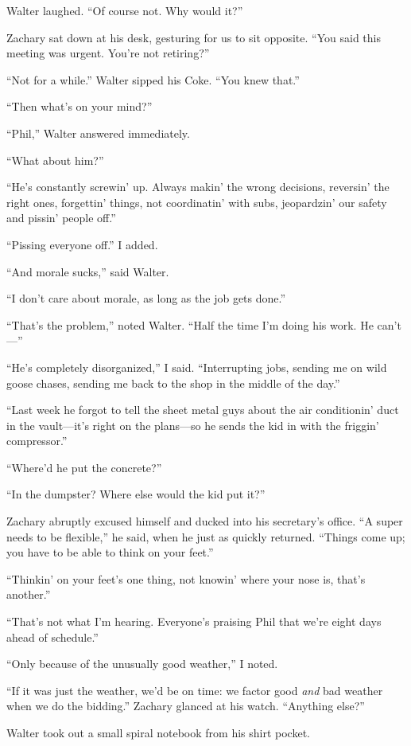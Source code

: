 Walter laughed. ``Of course not. Why would it?''

Zachary sat down at his desk, gesturing for us to sit opposite. ``You
said this meeting was urgent. You're not retiring?''

``Not for a while.'' Walter sipped his Coke. ``You knew that.''

``Then what's on your mind?''

``Phil,'' Walter answered immediately.

``What about him?''

``He's constantly screwin' up. Always makin' the wrong decisions,
reversin' the right ones, forgettin' things, not coordinatin' with subs,
jeopardzin' our safety and pissin' people off.''

``Pissing everyone off.'' I added.

``And morale sucks,'' said Walter.

``I don't care about morale, as long as the job gets done.''

``That's the problem,'' noted Walter. ``Half the time I'm doing his
work. He can't---''

``He's completely disorganized,'' I said. ``Interrupting jobs, sending
me on wild goose chases, sending me back to the shop in the middle of
the day.''

``Last week he forgot to tell the sheet metal guys about the air
conditionin' duct in the vault---it's right on the plans---so he sends
the kid in with the friggin' compressor.''

``Where'd he put the concrete?''

``In the dumpster? Where else would the kid put it?''

Zachary abruptly excused himself and ducked into his secretary's office.
``A super needs to be flexible,'' he said, when he just as quickly
returned. ``Things come up; you have to be able to think on your feet.''

``Thinkin' on your feet's one thing, not knowin' where your nose is,
that's another.''

``That's not what I'm hearing. Everyone's praising Phil that we're eight
days ahead of schedule.''

``Only because of the unusually good weather,'' I noted.

``If it was just the weather, we'd be on time: we factor good \emph{and}
bad weather when we do the bidding.'' Zachary glanced at his watch.
``Anything else?''

Walter took out a small spiral notebook from his shirt pocket.

